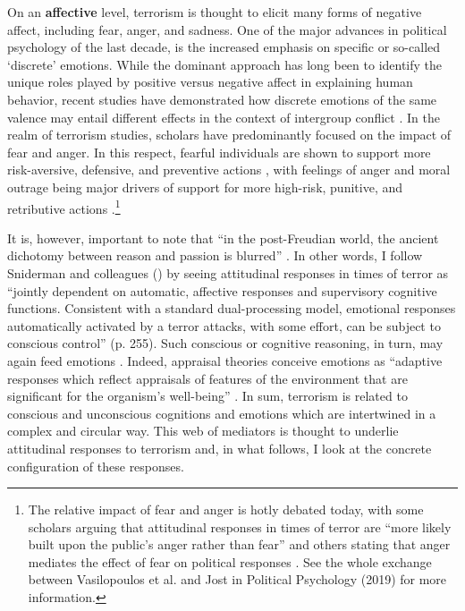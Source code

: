 On an \textbf{affective} level, terrorism is thought to elicit many forms of negative affect, including fear, anger, and sadness. One of the major advances in political psychology of the last decade, is the increased emphasis on specific or so-called `discrete' emotions. While the dominant approach has long been to identify the unique roles played by positive versus negative affect in explaining human behavior, recent studies have demonstrated how discrete emotions of the same valence may entail different effects in the context of intergroup conflict \citep{Pliskin2020}. In the realm of terrorism studies, scholars have predominantly focused on the impact of fear and anger. In this respect, fearful individuals are shown to support more risk-aversive, defensive, and preventive actions \citep{Huddy2005, Lerner2003a, Skitka2006}, with feelings of anger and moral outrage being major drivers of support for more high-risk, punitive, and retributive actions \citep{Fisk2019a, Skitka2006, Wayne2018}.\footnote{The relative impact of fear and anger is hotly debated today, with some scholars arguing that attitudinal responses in times of terror are ``more likely built upon the public’s anger rather than fear'' \citep[][p. 267]{Vasilopoulos2019c} and others stating that anger mediates the effect of fear on political responses \citep{Jost2019}. See the whole exchange between Vasilopoulos et al. and Jost in Political Psychology (2019) for more information.} 


It is, however, important to note that ``in the post-Freudian world, the ancient dichotomy between reason and passion is blurred'' \citep[][p. 340]{Jost2003}. In other words, I follow Sniderman and colleagues (\citeyear{Sniderman2019a}) by seeing attitudinal responses in times of terror as ``jointly dependent on automatic, affective responses and supervisory cognitive functions. Consistent with a standard dual-processing model, emotional responses automatically activated by a terror attacks, with some effort, can be subject to conscious control'' (p. 255). Such conscious or cognitive reasoning, in turn, may again feed emotions \citep{Moors2013}. Indeed, appraisal theories conceive emotions as ``adaptive responses which reflect appraisals of features of the environment that are significant for the organism’s well-being'' \citep[][p. 119]{Moors2013}. In sum, terrorism is related to conscious and unconscious cognitions and emotions which are intertwined in a complex and circular way. This web of mediators is thought to underlie attitudinal responses to terrorism and, in what follows, I look at the concrete configuration of these responses.

